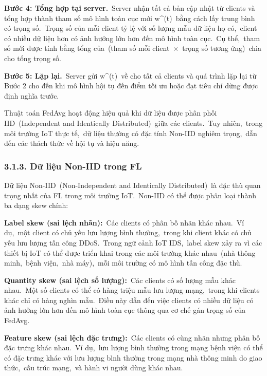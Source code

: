 \textbf{Bước 4: Tổng hợp tại server.}~Server nhận tất cả bản cập nhật từ clients và tổng hợp thành tham số mô hình toàn cục mới w\^{}(t)~bằng cách lấy trung bình có trọng số.~Trọng số của mỗi client tỷ lệ với số lượng mẫu dữ liệu họ có,~client có nhiều dữ liệu hơn có ảnh hưởng lớn hơn đến mô hình toàn cục.~Cụ thể,~tham số mới được tính bằng tổng của~(tham số mỗi client~×~trọng số tương ứng)~chia cho tổng trọng số.

\textbf{Bước 5: Lặp lại.}~Server gửi w\^{}(t)~về cho tất cả clients và quá trình lặp lại từ Bước 2 cho đến khi mô hình hội tụ đến điểm tối ưu hoặc đạt tiêu chí dừng được định nghĩa trước.

Thuật toán FedAvg hoạt động hiệu quả khi dữ liệu được phân phối IID~(Independent and Identically Distributed)~giữa các clients.~Tuy nhiên,~trong môi trường IoT thực tế,~dữ liệu thường có đặc tính Non-IID nghiêm trọng,~dẫn đến các thách thức về hội tụ và hiệu năng.

\subsubsection{3.1.3. Dữ liệu Non-IID trong FL}\label{dux1eef-liux1ec7u-non-iid-trong-fl}

Dữ liệu Non-IID~(Non-Independent and Identically Distributed)~là đặc thù quan trọng nhất của FL trong môi trường IoT.~Non-IID có thể được phân loại thành ba dạng skew chính:

\textbf{Label skew (sai lệch nhãn):}~Các clients có phân bố nhãn khác nhau.~Ví dụ,~một client có chủ yếu lưu lượng bình thường,~trong khi client khác có chủ yếu lưu lượng tấn công DDoS.~Trong ngữ cảnh IoT IDS,~label skew xảy ra vì các thiết bị IoT có thể được triển khai trong các môi trường khác nhau~(nhà thông minh,~bệnh viện,~nhà máy),~mỗi môi trường có mô hình tấn công đặc thù.

\textbf{Quantity skew (sai lệch số lượng):}~Các clients có số lượng mẫu khác nhau.~Một số clients có thể có hàng triệu mẫu lưu lượng mạng,~trong khi clients khác chỉ có hàng nghìn mẫu.~Điều này dẫn đến việc clients có nhiều dữ liệu có ảnh hưởng lớn hơn đến mô hình toàn cục thông qua cơ chế gán trọng số của FedAvg.

\textbf{Feature skew (sai lệch đặc trưng):}~Các clients có cùng nhãn nhưng phân bố đặc trưng khác nhau.~Ví dụ,~lưu lượng bình thường trong mạng bệnh viện có thể có đặc trưng khác với lưu lượng bình thường trong mạng nhà thông minh do giao thức,~cấu trúc mạng,~và hành vi người dùng khác nhau.


